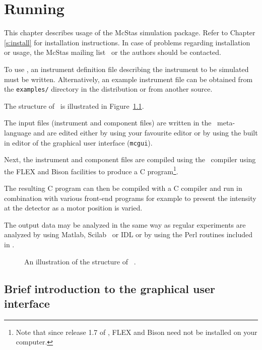 
\chapter{Running \MCS}
\label{c:running}
This chapter describes usage of the McStas simulation package. Refer
to Chapter \ref{s:install} for installation instructions. In case of
problems regarding installation or usage, the McStas mailing
list~\cite{mcstas_webpage} or the authors should be contacted.

To use \MCS, an instrument
definition file describing the instrument to be simulated must be
written. Alternatively, an example instrument file can be obtained
from the \verb+examples/+ directory in the distribution or from
another source. 

The structure of \MCS\ is illustrated in Figure~\ref{fig:structure}.

The input files (instrument and component files) are written in the \MCS\
meta-language and are edited either by using your favourite editor
or by using the built in editor of the graphical user interface
(\texttt{mcgui}). 

Next, the instrument and component files are compiled using the \MCS\ compiler
using the FLEX and Bison facilities to produce a C program\footnote{Note that
since release 1.7 of \MCS, FLEX and Bison need not be installed
on your computer.}. 

The resulting C program can then be
compiled with a C compiler and run in combination with various
front-end programs for example to present the intensity at the
detector as a motor position is varied.

The output data may be analyzed in the same way as regular experiments
are analyzed by using Matlab, Scilab~\cite{scilab_webpage} or IDL or by using the Perl routines included in \MCS .

\begin{figure}[htb!]
\begin{center}

\end{center}
\caption{An illustration of the structure of \MCS\ .}
\label{fig:structure}
\end{figure}

\section{Brief introduction to the graphical user interface}
\label{s:brief}

